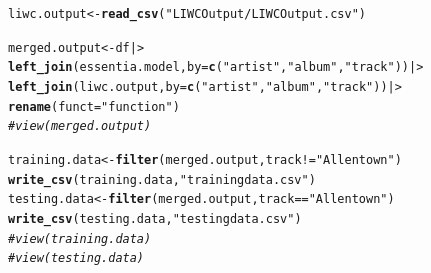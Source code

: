 \documentclass{article}\usepackage[]{graphicx}\usepackage[]{xcolor}
\makeatletter
\newcommand{\hlsng}[1]{\textcolor[rgb]{0.192,0.494,0.8}{#1}}%
\newcommand{\hlcom}[1]{\textcolor[rgb]{0.678,0.584,0.686}{\textit{#1}}}%
\newcommand{\hlopt}[1]{\textcolor[rgb]{0,0,0}{#1}}%
\newcommand{\hldef}[1]{\textcolor[rgb]{0.345,0.345,0.345}{#1}}%
\newcommand{\hlkwb}[1]{\textcolor[rgb]{0.69,0.353,0.396}{#1}}%
\newcommand{\hlkwc}[1]{\textcolor[rgb]{0.333,0.667,0.333}{#1}}%
\newcommand{\hlkwd}[1]{\textcolor[rgb]{0.737,0.353,0.396}{\textbf{#1}}}%
\newenvironment{kframe}{%
 \def\at@end@of@kframe{}%
 \ifinner\ifhmode%
  \def\at@end@of@kframe{\end{minipage}}%
  \begin{minipage}{\columnwidth}%
 \fi\fi%
 \def\FrameCommand##1{\hskip\@totalleftmargin \hskip-\fboxsep
 \colorbox{shadecolor}{##1}\hskip-\fboxsep
     \hskip-\linewidth \hskip-\@totalleftmargin \hskip\columnwidth}%
 \MakeFramed {\advance\hsize-\width
   \@totalleftmargin\z@ \linewidth\hsize
   \@setminipage}}%
 {\par\unskip\endMakeFramed%
 \at@end@of@kframe}
\newenvironment{knitrout}{}{} %
\makeatother
\begin{document}
\begin{enumerate}
\begin{knitrout}
\begin{kframe}
\begin{alltt}
\hldef{liwc.output} \hlkwb{<-} \hlkwd{read_csv}\hldef{(}\hlsng{"LIWCOutput/LIWCOutput.csv"}\hldef{)}

\hldef{merged.output} \hlkwb{<-} \hldef{df |>}
  \hlkwd{left_join}\hldef{(essentia.model,} \hlkwc{by} \hldef{=} \hlkwd{c}\hldef{(}\hlsng{"artist"}\hldef{,}\hlsng{"album"}\hldef{,}\hlsng{"track"}\hldef{)) |>}
  \hlkwd{left_join}\hldef{(liwc.output,} \hlkwc{by} \hldef{=} \hlkwd{c}\hldef{(}\hlsng{"artist"}\hldef{,}\hlsng{"album"}\hldef{,}\hlsng{"track"}\hldef{)) |>}
  \hlkwd{rename}\hldef{(}\hlkwc{funct} \hldef{=} \hlsng{"function"}\hldef{)}
\hlcom{# view(merged.output)}

\hldef{training.data} \hlkwb{<-} \hlkwd{filter}\hldef{(merged.output, track} \hlopt{!=} \hlsng{"Allentown"}\hldef{)}
\hlkwd{write_csv}\hldef{(training.data,} \hlsng{"trainingdata.csv"}\hldef{)}
\hldef{testing.data} \hlkwb{<-} \hlkwd{filter}\hldef{(merged.output, track} \hlopt{==} \hlsng{"Allentown"}\hldef{)}
\hlkwd{write_csv}\hldef{(testing.data,} \hlsng{"testingdata.csv"}\hldef{)}
\hlcom{# view(training.data)}
\hlcom{# view(testing.data)}


\end{alltt}
\end{kframe}
\end{knitrout}
\end{enumerate}
\end{document}

